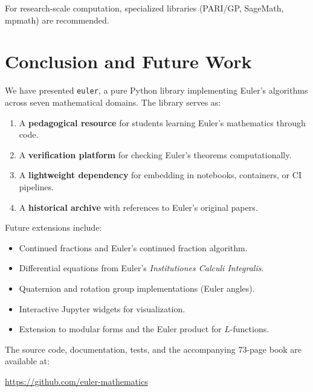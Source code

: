 \documentclass[11pt,a4paper]{article}
\theoremstyle{definition}
\begin{document}
For research-scale computation, specialized libraries (PARI/GP, SageMath, mpmath) are recommended.

\section{Conclusion and Future Work}
\label{sec:conclusion}

We have presented \texttt{euler}, a pure Python library implementing Euler's algorithms across seven mathematical domains. The library serves as:
\begin{enumerate}
    \item A \textbf{pedagogical resource} for students learning Euler's mathematics through code.
    \item A \textbf{verification platform} for checking Euler's theorems computationally.
    \item A \textbf{lightweight dependency} for embedding in notebooks, containers, or CI pipelines.
    \item A \textbf{historical archive} with references to Euler's original papers.
\end{enumerate}

Future extensions include:
\begin{itemize}
    \item Continued fractions and Euler's continued fraction algorithm.
    \item Differential equations from Euler's \emph{Institutiones Calculi Integralis}.
    \item Quaternion and rotation group implementations (Euler angles).
    \item Interactive Jupyter widgets for visualization.
    \item Extension to modular forms and the Euler product for $L$-functions.
\end{itemize}

The source code, documentation, tests, and the accompanying 73-page book are available at:
\begin{center}
\url{https://github.com/euler-mathematics}
\end{center}

\end{document}
